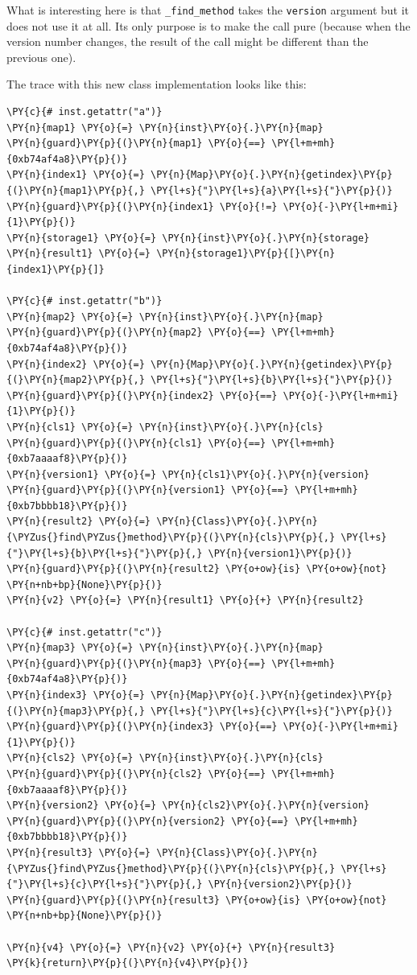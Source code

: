 \documentclass{sig-alternate}
\begin{document}
What is interesting here is that \texttt{\_find\_method} takes the \texttt{version}
argument but it does not use it at all. Its only purpose is to make the call
pure (because when the version number changes, the result of the call might be
different than the previous one).

The trace with this new class implementation looks like this:
\begin{Verbatim}[commandchars=\\\{\}]
\PY{c}{# inst.getattr("a")}
\PY{n}{map1} \PY{o}{=} \PY{n}{inst}\PY{o}{.}\PY{n}{map}
\PY{n}{guard}\PY{p}{(}\PY{n}{map1} \PY{o}{==} \PY{l+m+mh}{0xb74af4a8}\PY{p}{)}
\PY{n}{index1} \PY{o}{=} \PY{n}{Map}\PY{o}{.}\PY{n}{getindex}\PY{p}{(}\PY{n}{map1}\PY{p}{,} \PY{l+s}{"}\PY{l+s}{a}\PY{l+s}{"}\PY{p}{)}
\PY{n}{guard}\PY{p}{(}\PY{n}{index1} \PY{o}{!=} \PY{o}{-}\PY{l+m+mi}{1}\PY{p}{)}
\PY{n}{storage1} \PY{o}{=} \PY{n}{inst}\PY{o}{.}\PY{n}{storage}
\PY{n}{result1} \PY{o}{=} \PY{n}{storage1}\PY{p}{[}\PY{n}{index1}\PY{p}{]}

\PY{c}{# inst.getattr("b")}
\PY{n}{map2} \PY{o}{=} \PY{n}{inst}\PY{o}{.}\PY{n}{map}
\PY{n}{guard}\PY{p}{(}\PY{n}{map2} \PY{o}{==} \PY{l+m+mh}{0xb74af4a8}\PY{p}{)}
\PY{n}{index2} \PY{o}{=} \PY{n}{Map}\PY{o}{.}\PY{n}{getindex}\PY{p}{(}\PY{n}{map2}\PY{p}{,} \PY{l+s}{"}\PY{l+s}{b}\PY{l+s}{"}\PY{p}{)}
\PY{n}{guard}\PY{p}{(}\PY{n}{index2} \PY{o}{==} \PY{o}{-}\PY{l+m+mi}{1}\PY{p}{)}
\PY{n}{cls1} \PY{o}{=} \PY{n}{inst}\PY{o}{.}\PY{n}{cls}
\PY{n}{guard}\PY{p}{(}\PY{n}{cls1} \PY{o}{==} \PY{l+m+mh}{0xb7aaaaf8}\PY{p}{)}
\PY{n}{version1} \PY{o}{=} \PY{n}{cls1}\PY{o}{.}\PY{n}{version}
\PY{n}{guard}\PY{p}{(}\PY{n}{version1} \PY{o}{==} \PY{l+m+mh}{0xb7bbbb18}\PY{p}{)}
\PY{n}{result2} \PY{o}{=} \PY{n}{Class}\PY{o}{.}\PY{n}{\PYZus{}find\PYZus{}method}\PY{p}{(}\PY{n}{cls}\PY{p}{,} \PY{l+s}{"}\PY{l+s}{b}\PY{l+s}{"}\PY{p}{,} \PY{n}{version1}\PY{p}{)}
\PY{n}{guard}\PY{p}{(}\PY{n}{result2} \PY{o+ow}{is} \PY{o+ow}{not} \PY{n+nb+bp}{None}\PY{p}{)}
\PY{n}{v2} \PY{o}{=} \PY{n}{result1} \PY{o}{+} \PY{n}{result2}

\PY{c}{# inst.getattr("c")}
\PY{n}{map3} \PY{o}{=} \PY{n}{inst}\PY{o}{.}\PY{n}{map}
\PY{n}{guard}\PY{p}{(}\PY{n}{map3} \PY{o}{==} \PY{l+m+mh}{0xb74af4a8}\PY{p}{)}
\PY{n}{index3} \PY{o}{=} \PY{n}{Map}\PY{o}{.}\PY{n}{getindex}\PY{p}{(}\PY{n}{map3}\PY{p}{,} \PY{l+s}{"}\PY{l+s}{c}\PY{l+s}{"}\PY{p}{)}
\PY{n}{guard}\PY{p}{(}\PY{n}{index3} \PY{o}{==} \PY{o}{-}\PY{l+m+mi}{1}\PY{p}{)}
\PY{n}{cls2} \PY{o}{=} \PY{n}{inst}\PY{o}{.}\PY{n}{cls}
\PY{n}{guard}\PY{p}{(}\PY{n}{cls2} \PY{o}{==} \PY{l+m+mh}{0xb7aaaaf8}\PY{p}{)}
\PY{n}{version2} \PY{o}{=} \PY{n}{cls2}\PY{o}{.}\PY{n}{version}
\PY{n}{guard}\PY{p}{(}\PY{n}{version2} \PY{o}{==} \PY{l+m+mh}{0xb7bbbb18}\PY{p}{)}
\PY{n}{result3} \PY{o}{=} \PY{n}{Class}\PY{o}{.}\PY{n}{\PYZus{}find\PYZus{}method}\PY{p}{(}\PY{n}{cls}\PY{p}{,} \PY{l+s}{"}\PY{l+s}{c}\PY{l+s}{"}\PY{p}{,} \PY{n}{version2}\PY{p}{)}
\PY{n}{guard}\PY{p}{(}\PY{n}{result3} \PY{o+ow}{is} \PY{o+ow}{not} \PY{n+nb+bp}{None}\PY{p}{)}

\PY{n}{v4} \PY{o}{=} \PY{n}{v2} \PY{o}{+} \PY{n}{result3}
\PY{k}{return}\PY{p}{(}\PY{n}{v4}\PY{p}{)}
\end{Verbatim}
\end{document}
